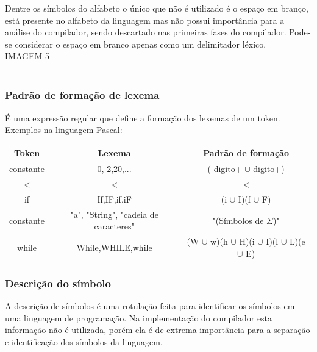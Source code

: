 Dentre os símbolos do alfabeto o único que não é utilizado é o espaço em branço, está presente no alfabeto da linguagem mas não possui importância para a análise do compilador, sendo descartado nas primeiras fases do compilador. Pode-se considerar o espaço em branco apenas como um delimitador léxico.\\

IMAGEM 5\\ \\

\subsubsection{Padrão de formação de lexema}
É uma expressão regular que define a formação dos  lexemas de um token.\\

Exemplos na linguagem Pascal:\\

\begin{table}[!h]%
{}%
\begin{tabular}{|c|c|c|}

\textbf{Token} & \textbf{Lexema} & \textbf{Padrão de formação} \\
\hline
constante & 0,-2,20,... & (-digito+ $\cup$ digito+)   \\
\hline
\textless & \textless & \textless\\
\hline
if   & If,IF,if,iF & (i $\cup$ I)(f $\cup$ F)\\
\hline
constante & "a", "String", "cadeia de caracteres" & "(Símbolos de $\Sigma$)"\\
\hline
while & While,WHILE,while & (W $\cup$ w)(h $\cup$ H)(i $\cup$ I)(l $\cup$ L)(e $\cup$ E)\\
\end{tabular}
\end{table}


\subsubsection{Descrição do símbolo} 
A descrição de símbolos é uma rotulação feita para identificar os símbolos em uma linguagem de programação. Na implementação do compilador esta informação não é utilizada, porém ela é de extrema importância para a separação e identificação dos símbolos da linguagem.\\

